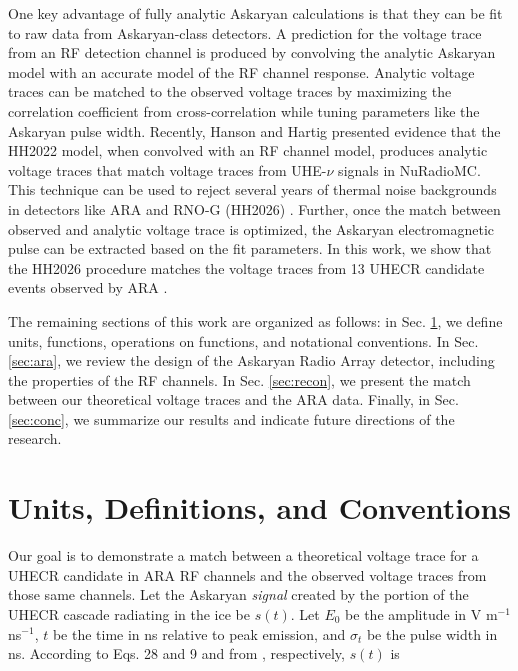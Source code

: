 \documentclass[amsmath,amssymb,aps,prd,10pt,twocolumn,showkeys]{revtex4}
\begin{document}
One key advantage of fully analytic Askaryan calculations is that they can be fit to raw data from Askaryan-class detectors.  A prediction for the voltage trace from an RF detection channel is produced by convolving the analytic Askaryan model with an accurate model of the RF channel response.  Analytic voltage traces can be matched to the observed voltage traces by maximizing the correlation coefficient from cross-correlation while tuning parameters like the Askaryan pulse width.  Recently, Hanson and Hartig presented evidence that the HH2022 model, when convolved with an RF channel model, produces analytic voltage traces that match voltage traces from UHE-$\nu$ signals in NuRadioMC.  This technique can be used to reject several years of thermal noise backgrounds in detectors like ARA and RNO-G (HH2026) \cite{10.1140/epjc/s10052-020-7612-8,hansonnoyearcomplex-ae0}.  Further, once the match between observed and analytic voltage trace is optimized, the Askaryan electromagnetic pulse can be extracted based on the fit parameters.  In this work, we show that the HH2026 procedure matches the voltage traces from 13 UHECR candidate events observed by ARA \cite{xwqy-yzrk}.

The remaining sections of this work are organized as follows: in Sec. \ref{sec:unit}, we define units, functions, operations on functions, and notational conventions.  In Sec. \ref{sec:ara}, we review the design of the Askaryan Radio Array detector, including the properties of the RF channels.  In Sec. \ref{sec:recon}, we present the match between our theoretical voltage traces and the ARA data.  Finally, in Sec. \ref{sec:conc}, we summarize our results and indicate future directions of the research.

\section{Units, Definitions, and Conventions}
\label{sec:unit}

Our goal is to demonstrate a match between a theoretical voltage trace for a UHECR candidate in ARA RF channels and the observed voltage traces from those same channels.  Let the Askaryan \textit{signal} created by the portion of the UHECR cascade radiating in the ice be $s(t)$.  Let $E_0$ be the amplitude in V m$^{-1}$ ns$^{-1}$, $t$ be the time in ns relative to peak emission, and $\sigma_t$ be the pulse width in ns.  According to Eqs. 28 and 9 and from \cite{PhysRevD.105.123019,hansonnoyearcomplex-ae0}, respectively, $s(t)$ is 
\end{document}
